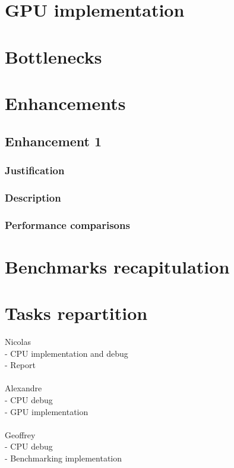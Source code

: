 \documentclass{article}
\begin{document}
\section{GPU implementation}

\section{Bottlenecks}

\section{Enhancements}

\subsection{Enhancement 1}

\subsubsection{Justification}

\subsubsection{Description}

\subsubsection{Performance comparisons}

\section{Benchmarks recapitulation}

\section{Tasks repartition}

\noindent
Nicolas\\
- CPU implementation and debug\\
- Report\\
\\
Alexandre\\
- CPU debug\\
- GPU implementation\\
\\
Geoffrey\\
- CPU debug\\
- Benchmarking implementation
\end{document}
